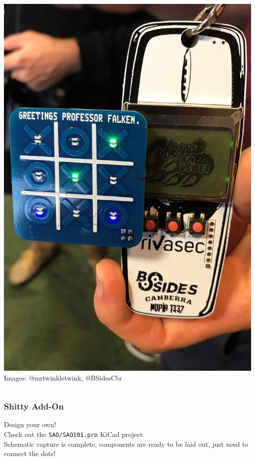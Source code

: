 \documentclass[t]{beamer}
\begin{document}
\begin{frame}
\begin{columns}[c]
	\centering
	\includegraphics[width=\linewidth]{joshsao.jpg}
	Images: @mrtwinkletwink, @BSidesCbr
\end{columns}
\end{frame}
\begin{frame}
\frametitle{Shitty Add-On}
Design your own!\\[10pt]
Check out the \texttt{SAO/SAO101.pro} KiCad project\\
Schematic capture is complete, components are ready to be laid out, just need to connect the dots!\\[10pt]

\end{frame}
\end{document}
